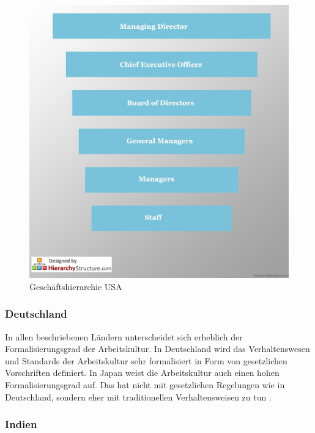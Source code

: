 \begin{figure}[ht]
\centering
\includegraphics[width=0.7\linewidth]{./images/USA-Business-Hierarchy}
\caption{Geschäftshierarchie USA \cite{HierarchieUSA}}
\label{fig:USA-Business-Hierarchy}
\end{figure}


	\subsubsection{Deutschland}
	In allen beschriebenen Ländern unterscheidet sich erheblich der Formalisierungsgrad der Arbeitskultur. In Deutschland wird das Verhaltenswesen und Standards der Arbeitskultur sehr formalisiert in Form von gesetzlichen Vorschriften definiert. In Japan weist die Arbeitskultur auch einen hohen Formalisierungsgrad auf. Das hat nicht mit gesetzlichen Regelungen wie in Deutschland, sondern eher mit traditionellen Verhaltensweisen zu tun \cite[236]{3LaenderVergl}.
	\subsubsection{Indien}
	